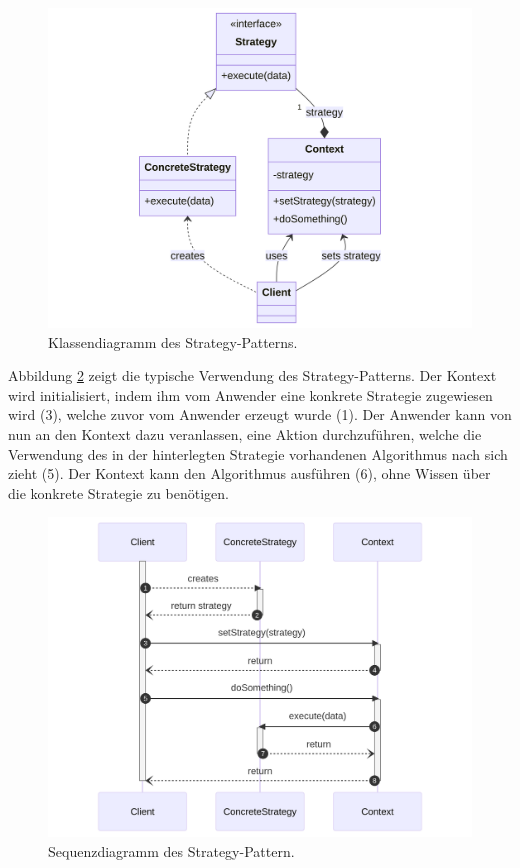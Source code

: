 \begin{figure}[htb]
	\centering
	\includegraphics[width=0.75\linewidth]{images/patterns/strategy-class.png}
	\caption{Klassendiagramm des Strategy-Patterns. \cite{skobeleva_strategy_2023}}
	\label{fig:strategy-class}
\end{figure}

Abbildung \ref{fig:strategy-seq} zeigt die typische Verwendung des Strategy-Patterns. Der Kontext wird initialisiert, indem ihm vom Anwender eine konkrete Strategie zugewiesen wird (3), welche zuvor vom Anwender erzeugt wurde (1). Der Anwender kann von nun an den Kontext dazu veranlassen, eine Aktion durchzuführen, welche die Verwendung des in der hinterlegten Strategie vorhandenen Algorithmus nach sich zieht (5). Der Kontext kann den Algorithmus ausführen (6), ohne Wissen über die konkrete Strategie zu benötigen.

\begin{figure}[htb]
	\centering
	\includegraphics[width=0.75\linewidth]{images/patterns/strategy-seq.png}
	\caption{Sequenzdiagramm des Strategy-Pattern. \cite{skobeleva_strategy_2023}}
	\label{fig:strategy-seq}
\end{figure}

